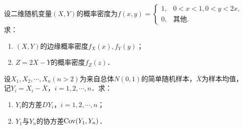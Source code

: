 \documentclass[plain,noanswer,medmath]{../../template/jnuexam}
\begin{document}
\begin{problem}[points=9]
设二维随机变量$(X,Y)$的概率密度为$f(x,y) = \begin{cases}
  1, & 0 < x < 1,0 < y < 2x, \\
  0, & \text{其他}.
\end{cases}$ 求：
\begin{enumerate}
\item $(X,Y)$的边缘概率密度$f_X(x),f_Y(y)$；
\item $Z = 2X - Y$的概率密度$f_Z(z)$．
\end{enumerate}
\end{problem}


\begin{problem}[points=9]
设$X_1,X_2, \cdots ,X_n(n > 2)$为来自总体$N(0,1)$的简单随机样本，$\overline{X}$为样本均值，
记$Y_i = X_i - \overline{X}$，$i = 1,2, \cdots ,n$．求：
\begin{enumerate}
\item $Y_i$的方差$DY_i$，$i = 1,2, \cdots ,n$；
\item $Y_1$与$Y_n$的协方差$\operatorname{Cov} (Y_1,Y_n)$．
\end{enumerate}
\end{problem}
\end{document}
